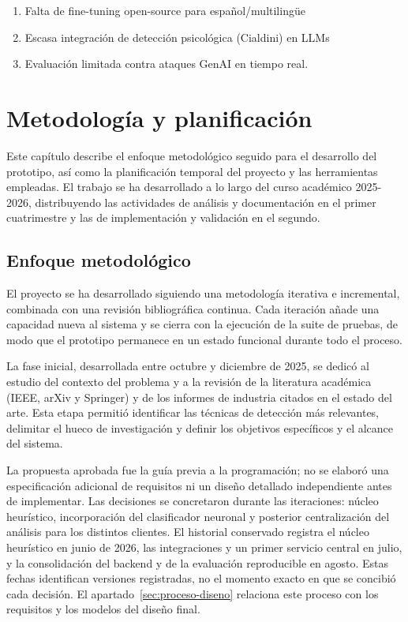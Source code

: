 \documentclass[11pt,a4paper,oneside]{report}
\begin{document}
\begin{enumerate}
  \item Falta de fine-tuning open-source para español/multilingüe
  \item Escasa integración de detección psicológica (Cialdini) en LLMs
  \item Evaluación limitada contra ataques GenAI en tiempo real.
\end{enumerate}

\chapter{Metodología y planificación}

Este capítulo describe el enfoque metodológico seguido para el desarrollo del prototipo, así como la planificación temporal del proyecto y las herramientas empleadas. El trabajo se ha desarrollado a lo largo del curso académico 2025-2026, distribuyendo las actividades de análisis y documentación en el primer cuatrimestre y las de implementación y validación en el segundo.

\section{Enfoque metodológico}
\label{sec:metodologia}

El proyecto se ha desarrollado siguiendo una metodología iterativa e incremental, combinada con una revisión bibliográfica continua. Cada iteración añade una capacidad nueva al sistema y se cierra con la ejecución de la suite de pruebas, de modo que el prototipo permanece en un estado funcional durante todo el proceso.

La fase inicial, desarrollada entre octubre y diciembre de 2025, se dedicó al estudio del contexto del problema y a la revisión de la literatura académica (IEEE, arXiv y Springer) y de los informes de industria citados en el estado del arte. Esta etapa permitió identificar las técnicas de detección más relevantes, delimitar el hueco de investigación y definir los objetivos específicos y el alcance del sistema.

La propuesta aprobada fue la guía previa a la programación; no se elaboró una especificación adicional de requisitos ni un diseño detallado independiente antes de implementar. Las decisiones se concretaron durante las iteraciones: núcleo heurístico, incorporación del clasificador neuronal y posterior centralización del análisis para los distintos clientes. El historial conservado registra el núcleo heurístico en junio de 2026, las integraciones y un primer servicio central en julio, y la consolidación del backend y de la evaluación reproducible en agosto. Estas fechas identifican versiones registradas, no el momento exacto en que se concibió cada decisión. El apartado~\ref{sec:proceso-diseno} relaciona este proceso con los requisitos y los modelos del diseño final.
\end{document}
